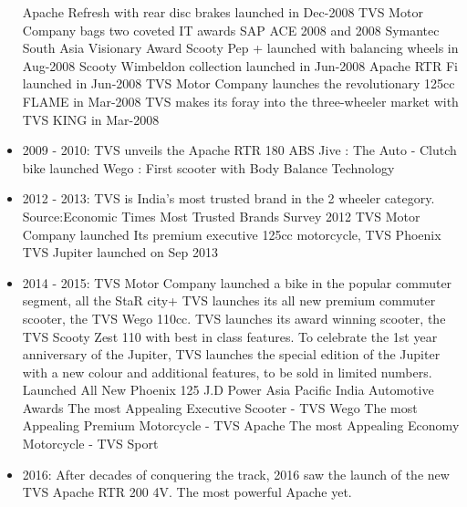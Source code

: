 \begin{itemize}
	Apache Refresh with rear disc brakes launched in Dec-2008
	TVS Motor Company bags two coveted IT awards SAP ACE 2008 and 2008 Symantec South Asia Visionary Award
	Scooty Pep + launched with balancing wheels in Aug-2008
	Scooty Wimbeldon collection launched in Jun-2008
	Apache RTR Fi launched in Jun-2008
	TVS Motor Company launches the revolutionary 125cc FLAME in Mar-2008
	TVS makes its foray into the three-wheeler market with TVS KING in Mar-2008
	\item 2009 - 2010:
	TVS unveils the Apache RTR 180 ABS
	Jive : The Auto - Clutch bike launched
	Wego : First scooter with Body Balance Technology
	\item 2012 - 2013:
	TVS is India's most trusted brand in the 2 wheeler category.
	Source:Economic Times Most Trusted Brands Survey 2012
	TVS Motor Company launched Its premium executive 125cc motorcycle, TVS Phoenix
	TVS Jupiter launched on Sep 2013
	
	\item 2014 - 2015:
	TVS Motor Company launched a bike in the popular commuter segment, all the StaR city+
	TVS launches its all new premium commuter scooter, the TVS Wego 110cc.
	TVS launches its award winning scooter, the TVS Scooty Zest 110 with best in class features.
	To celebrate the 1st year anniversary of the Jupiter, TVS launches the special edition of the Jupiter with a new colour and additional features, to be sold in limited numbers.
	Launched All New Phoenix 125
	J.D Power Asia Pacific India Automotive Awards
	The most Appealing Executive Scooter - TVS Wego
	The most Appealing Premium Motorcycle - TVS Apache
	The most Appealing Economy Motorcycle - TVS Sport
	
	\item 2016:
	After decades of conquering the track, 2016 saw the launch of the new TVS Apache RTR 200 4V. The most powerful Apache yet.
\end{itemize}	

\vspace{0.7cm}

